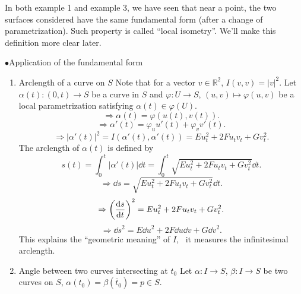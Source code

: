 \begin{remark}
    In both example 1 and example 3, we have seen that near a point, 
    the two surfaces considered have the same  
    fundamental form
     (after a change of parametrization). Such property is called
      ``local isometry''. We'll make this definition more clear later.
\end{remark}

\(\bullet\)Application of the  fundamental form

\begin{enumerate}[(1)]
    \item Arclength of a curve on \(S\)
    Note that for a vector \(v\in \mathbb{R}^2\), \(I(v,v)=|v|^2\).
    Let \(\alpha(t)\colon (0,t)\to S\) be a curve in \(S\) and 
    \(\varphi \colon U\to S\), \((u,v)\mapsto\varphi (u,v)\) be a 
    local parametrization satisfying 
    \(\alpha(t)\in \varphi(U)\).
    \[
    \Rightarrow \alpha(t)=\varphi\left(u(t),v(t)\right) .   
    \]
    \[
      \Rightarrow\alpha'(t)=\varphi_u u'(t)+\varphi_v v'(t) .
    \]
    \[\Rightarrow \left|\alpha'(t)\right|^2=
    I\left(\alpha'(t),\alpha'(t)\right)=E u_t^2+2F u_t v_t +G v_t^2.\]
    The arclength of \(\alpha(t)\) is defined by 
    \[
        s(t)=\int_0^t  \left|\alpha'(t)\right|\dd t
        =\int_0^t \sqrt{E u_t^2+2F u_t v_t +G v_t^2}\dd t  .
    \]
    \[
        \Rightarrow \dd s=\sqrt{E u_t^2+2F u_t v_t +G v_t^2}\dd t.
    \]
    \[
        \Rightarrow\left(\dv{s}{t}\right)^2=E u_t^2+2F u_t v_t +G v_t^2.
    \]
    \[
        \Rightarrow \dd s^2=E \dd u^2+2F \dd u \dd v +G \dd v^2    .
    \]
    This explains the ``geometric meaning'' of \(I\), \ie\ it measures 
    the infinitesimal arclength.
    \item Angle between two curves intersecting at \(t_0\)
    Let \(\alpha\colon I\to S\), \(\beta\colon I\to S\) be two curves 
    on \(S\), \(\alpha(t_0)=\beta(\bar{t}_0)=p\in S\). 
    \begin{center}
        



\begin{tikzpicture}[x=0.75pt,y=0.75pt,yscale=-1,xscale=1]


\end{tikzpicture}
\end{center}
\end{enumerate}
